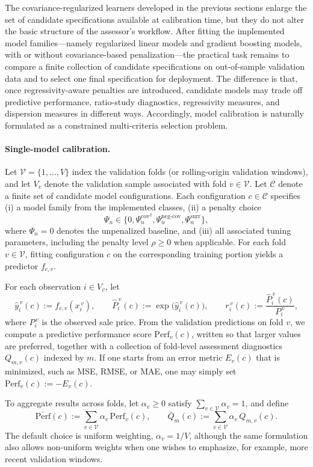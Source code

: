 \documentclass[12pt, draft]{article}
\theoremstyle{plain}
\theoremstyle{definition}
\newcommand{\1}{\mathbf{1}}
\begin{document}
The covariance-regularized learners developed in the previous sections enlarge the set of candidate specifications available at calibration time, but they do not alter the basic structure of the assessor's workflow. After fitting the implemented model families---namely regularized linear models and gradient boosting models, with or without covariance-based penalization---the practical task remains to compare a finite collection of candidate specifications on out-of-sample validation data and to select one final specification for deployment. The difference is that, once regressivity-aware penalties are introduced, candidate models may trade off predictive performance, ratio-study diagnostics, regressivity measures, and dispersion measures in different ways. Accordingly, model calibration is naturally formulated as a constrained multi-criteria selection problem.

\paragraph{Single-model calibration.}
Let $\mathcal V=\{1,\dots,V\}$ index the validation folds (or rolling-origin validation windows), and let $V_v$ denote the validation sample associated with fold $v\in\mathcal V$. Let $\mathcal C$ denote a finite set of candidate model configurations. Each configuration $c\in\mathcal C$ specifies
(i) a model family from the implemented classes,
(ii) a penalty choice
\[
\Psi_n \in \{0,\Psi_n^{\mathrm{cov}^2},\Psi_n^{\mathrm{neg\mbox{-}cov}},\Psi_n^{\mathrm{surr}}\},
\]
where $\Psi_n=0$ denotes the unpenalized baseline,
and
(iii) all associated tuning parameters, including the penalty level $\rho\ge 0$ when applicable.
For each fold $v\in\mathcal V$, fitting configuration $c$ on the corresponding training portion yields a predictor $f_{c,v}$.

For each observation $i\in V_v$, let
\[
\hat y_i^{\,v}(c):=f_{c,v}(x_i^{\,v}),
\qquad
\hat P_i^{\,v}(c):=\exp\!\bigl(\hat y_i^{\,v}(c)\bigr),
\qquad
r_i^{\,v}(c):=\frac{\hat P_i^{\,v}(c)}{P_i^{\,v}},
\]
where $P_i^{\,v}$ is the observed sale price. From the validation predictions on fold $v$, we compute a predictive performance score $\mathrm{Perf}_v(c)$, written so that larger values are preferred, together with a collection of fold-level assessment diagnostics $Q_{m,v}(c)$ indexed by $m$. If one starts from an error metric $E_v(c)$ that is minimized, such as MSE, RMSE, or MAE, one may simply set $\mathrm{Perf}_v(c):=-E_v(c)$.

To aggregate results across folds, let $\alpha_v\ge 0$ satisfy $\sum_{v\in\mathcal V}\alpha_v=1$, and define
\[
\bar{\mathrm{Perf}}(c):=\sum_{v\in\mathcal V}\alpha_v\,\mathrm{Perf}_v(c),
\qquad
\bar Q_m(c):=\sum_{v\in\mathcal V}\alpha_v\,Q_{m,v}(c).
\]
The default choice is uniform weighting, $\alpha_v=1/V$, although the same formulation also allows non-uniform weights when one wishes to emphasize, for example, more recent validation windows.
\end{document}
